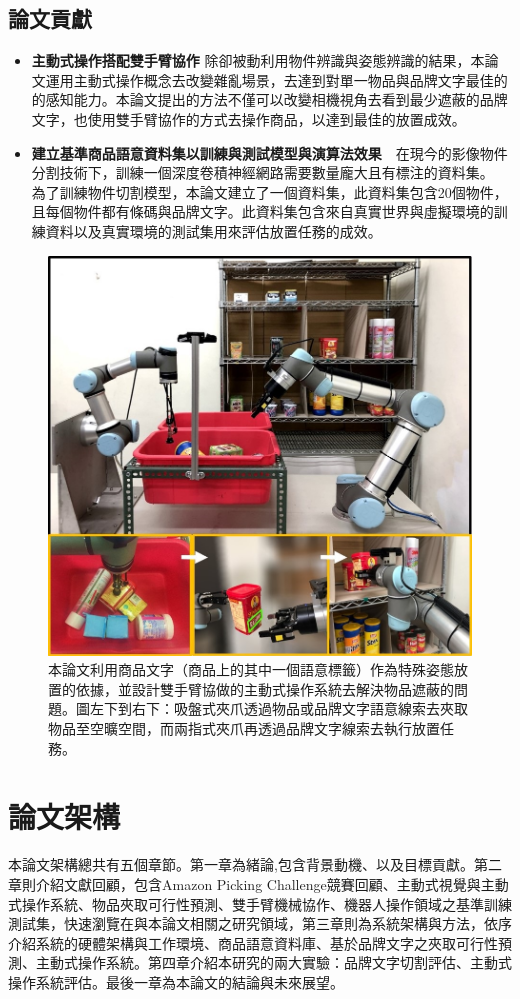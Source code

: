 \subsection{論文貢獻}
\begin{itemize}
\item \textbf{主動式操作搭配雙手臂協作} 除卻被動利用物件辨識與姿態辨識的結果，本論文運用主動式操作概念去改變雜亂場景，去達到對單一物品與品牌文字最佳的的感知能力。本論文提出的方法不僅可以改變相機視角去看到最少遮蔽的品牌文字，也使用雙手臂協作的方式去操作商品，以達到最佳的放置成效。
\item \textbf{建立基準商品語意資料集以訓練與測試模型與演算法效果}　在現今的影像物件分割技術下，訓練一個深度卷積神經網路需要數量龐大且有標注的資料集。
為了訓練物件切割模型，本論文建立了一個資料集，此資料集包含20個物件，且每個物件都有條碼與品牌文字。此資料集包含來自真實世界與虛擬環境的訓練資料以及真實環境的測試集用來評估放置任務的成效。
\end{itemize}

\begin{figure}[ht]
	\centering
	\includegraphics[height=!, width=0.7\linewidth, keepaspectratio=true]
	{./figures/pose-aware-placing-teaser-v3.jpg}
  \caption{本論文利用商品文字（商品上的其中一個語意標籤）作為特殊姿態放置的依據，並設計雙手臂協做的主動式操作系統去解決物品遮蔽的問題。圖左下到右下：吸盤式夾爪透過物品或品牌文字語意線索去夾取物品至空曠空間，而兩指式夾爪再透過品牌文字線索去執行放置任務。}
  \label{figure:teaser}
\end{figure}

\section{論文架構}
本論文架構總共有五個章節。第一章為緒論,包含背景動機、以及目標貢獻。第二章則介紹文獻回顧，包含Amazon Picking Challenge競賽回顧、主動式視覺與主動式操作系統、物品夾取可行性預測、雙手臂機械協作、機器人操作領域之基準訓練測試集，快速瀏覽在與本論文相關之研究領域，第三章則為系統架構與方法，依序介紹系統的硬體架構與工作環境、商品語意資料庫、基於品牌文字之夾取可行性預測、主動式操作系統。第四章介紹本研究的兩大實驗：品牌文字切割評估、主動式操作系統評估。最後一章為本論文的結論與未來展望。
